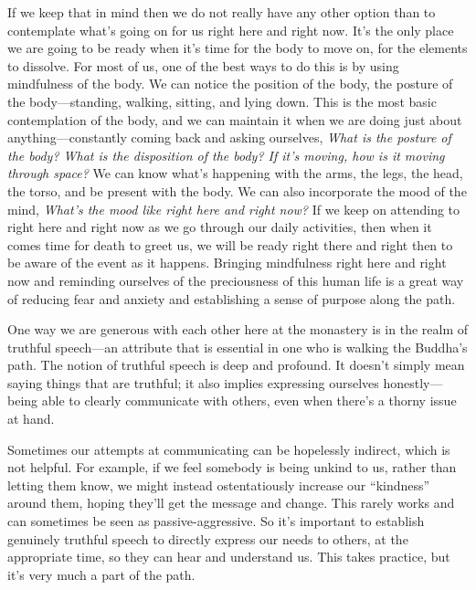If we keep that in mind then we do not really have any other option 
than to contemplate what's going on for us right here and right now. 
It's the only place we are going to be ready when it's time for the 
body to move on, for the elements to dissolve. For most of us, one of 
the best ways to do this is by using mindfulness of the body. We can 
notice the position of the body, the posture of the body---standing, 
walking, sitting, and lying down. This is the most basic contemplation 
of the body, and we can maintain it when we are doing just about 
anything---constantly coming back and asking ourselves, \emph{What is 
the posture of the body? What is the disposition of the body? If it's 
moving, how is it moving through space?} We can know what's happening 
with the arms, the legs, the head, the torso, and be present with the 
body. We can also incorporate the mood of the mind, \emph{What's the 
mood like right here and right now?} If we keep on attending to right 
here and right now as we go through our daily activities, then when it 
comes time for death to greet us, we will be ready right there and 
right then to be aware of the event as it happens. Bringing mindfulness 
right here and right now and reminding ourselves of the preciousness of 
this human life is a great way of reducing fear and anxiety and 
establishing a sense of purpose along the path.


One way we are generous with each other here at the monastery is in the 
realm of truthful speech---an attribute that is essential in one who is 
walking the Buddha's path. The notion of truthful speech is deep and 
profound. It doesn't simply mean saying things that are truthful; it 
also implies expressing ourselves honestly---being able to clearly 
communicate with others, even when there's a thorny issue at hand.

Sometimes our attempts at communicating can be hopelessly indirect, 
which is not helpful. For example, if we feel somebody is being unkind 
to us, rather than letting them know, we might instead ostentatiously 
increase our ``kindness'' around them, hoping they'll get the message 
and change. This rarely works and can sometimes be seen as 
passive-aggressive. So it's important to establish genuinely truthful 
speech to directly express our needs to others, at the appropriate 
time, so they can hear and understand us. This takes practice, but it's 
very much a part of the path.

